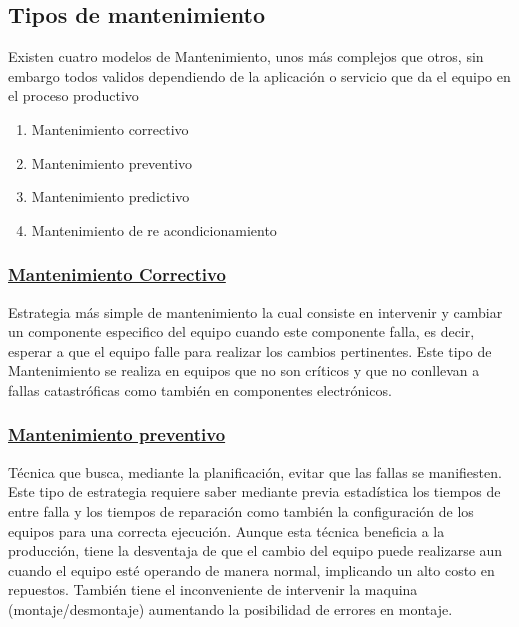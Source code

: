 		\subsection{Tipos de mantenimiento}
			Existen cuatro modelos de Mantenimiento, unos más complejos que otros, sin embargo todos validos dependiendo de la aplicación o servicio que da el equipo en el proceso productivo \cite{mantenimientoindustrial}
			\begin{enumerate}
				\item Mantenimiento correctivo
				\item Mantenimiento preventivo
				\item Mantenimiento predictivo
				\item Mantenimiento de re acondicionamiento
			\end{enumerate}
			\subsubsection{\underline{Mantenimiento Correctivo}}
				Estrategia más simple de mantenimiento la cual consiste en intervenir y cambiar un componente especifico del equipo cuando este componente falla, es decir, esperar a que el equipo falle para realizar los cambios pertinentes. Este tipo de Mantenimiento se realiza en equipos que no son críticos y que no conllevan a fallas catastróficas como también en componentes electrónicos.
				
			\subsubsection{\underline{Mantenimiento preventivo}}
				Técnica que busca, mediante la planificación, evitar que las fallas se manifiesten. Este tipo de estrategia requiere saber mediante previa estadística los tiempos de entre falla y los tiempos de reparación como también la configuración de los equipos para una correcta ejecución. Aunque esta técnica beneficia a la producción, tiene la desventaja de que el cambio del equipo puede realizarse aun cuando el equipo esté operando de manera normal, implicando un alto costo en repuestos. También tiene el inconveniente de intervenir la maquina (montaje/desmontaje) aumentando la posibilidad de errores en montaje.	
				

